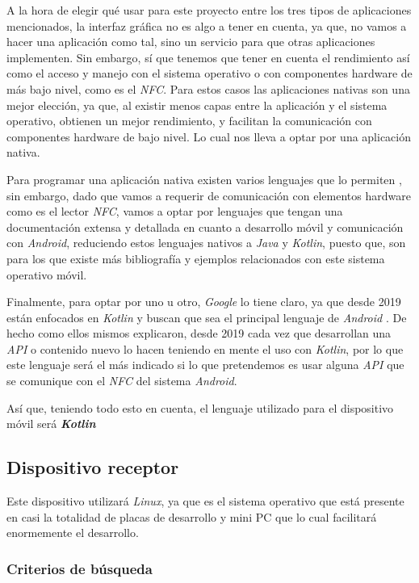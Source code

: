 A la hora de elegir qué usar para este proyecto entre los tres tipos de
aplicaciones mencionados, la interfaz gráfica no es algo a tener en cuenta, ya
que, no vamos a hacer una aplicación como tal, sino un servicio para que otras
aplicaciones implementen. Sin embargo, sí que tenemos que tener en cuenta el
rendimiento así como el acceso y manejo con el sistema operativo o con
componentes hardware de más bajo nivel, como es el \emph{NFC}. Para estos casos las
aplicaciones nativas son una mejor elección, ya que, al existir menos capas entre
la aplicación y el sistema operativo, obtienen un mejor rendimiento, y facilitan
la comunicación con componentes hardware de bajo nivel. Lo cual nos lleva a
optar por una aplicación nativa.

Para programar una aplicación nativa existen varios lenguajes que lo permiten
\cite{lenguajes-nativos}, sin embargo, dado que vamos a requerir de comunicación
con elementos hardware como es el lector \emph{NFC}, vamos a optar por lenguajes
que tengan una documentación extensa y detallada en cuanto a desarrollo móvil y
comunicación con \emph{Android}, reduciendo estos lenguajes nativos a \emph{Java} y
\emph{Kotlin}, puesto que, son para los que existe más bibliografía y ejemplos
relacionados con este sistema operativo móvil.

Finalmente, para optar por uno u otro, \emph{Google} lo tiene claro, ya que desde 2019
están enfocados en \emph{Kotlin} y buscan que sea el principal lenguaje de \emph{Android}
\cite{prioridad-kotlin}. De hecho como ellos mismos explicaron, desde 2019 cada
vez que desarrollan una \emph{API} o contenido nuevo lo hacen teniendo en mente
el uso con \emph{Kotlin}, por lo que este lenguaje será el más indicado si lo que
pretendemos es usar alguna \emph{API} que se comunique con el \emph{NFC} del
sistema \emph{Android}.

Así que, teniendo todo esto en cuenta, el lenguaje utilizado para el
dispositivo móvil será \textbf{\emph{Kotlin}}

\subsection{Dispositivo receptor}

Este dispositivo utilizará \emph{Linux}, ya que es el sistema operativo que está
presente en casi la totalidad de placas de desarrollo y mini PC que lo cual
facilitará enormemente el desarrollo. 

\subsubsection{Criterios de búsqueda}

